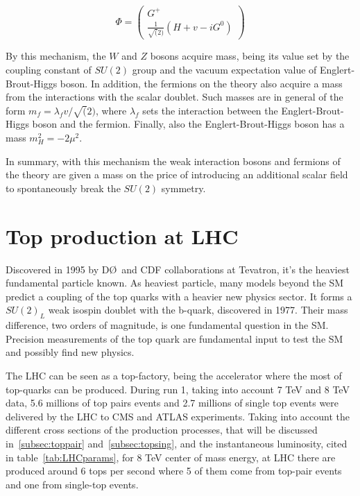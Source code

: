 \begin{equation}
  \label{eq:TransHiggsDoublet}
  \Phi=\left(
    \begin{array}{c}
      G^{+} \\
      \frac{1}{\sqrt(2)}(H+v-iG^{0})
    \end{array}
  \right)
\end{equation}

By this mechanism, the $W$ and $Z$ bosons acquire mass, being its value set by the coupling constant of $SU(2)$ group and the vacuum expectation value of Englert-Brout-Higgs boson. In addition, the fermions on the theory also acquire a mass from the interactions with the scalar doublet. Such masses are in general of the form $m_{f}=\lambda_{f}v/\sqrt(2)$, where $\lambda_{f}$ sets the interaction between the Englert-Brout-Higgs boson and the fermion. Finally, also the Englert-Brout-Higgs boson has a mass $m_{H}^{2}=-2\mu^{2}$.

In summary, with this mechanism the weak interaction bosons and fermions of the theory are given a mass on the price of introducing an additional scalar field to spontaneously break the $SU(2)$ symmetry.

\section{Top production at LHC}

Discovered in 1995 by D\O~and CDF collaborations at Tevatron, it's the heaviest fundamental particle known. As heaviest particle, many models beyond the SM predict a coupling of the top quarks with a heavier new physics sector. It forms a $SU(2)_{L}$ weak isospin doublet with the b-quark, discovered in 1977. Their mass difference, two orders of magnitude, is one fundamental question in the SM. Precision measurements of the top quark are fundamental input to test the SM and possibly find new physics.

The LHC can be seen as a top-factory, being the accelerator where the most of top-quarks can be produced. During run 1, taking into account 7 TeV and 8 TeV data, 5.6 millions of top pairs events and 2.7 millions of single top events were delivered by the LHC to CMS and ATLAS experiments. Taking into account the different cross sections of the production processes, that will be discussed in~\ref{subsec:toppair} and~\ref{subsec:topsing}, and the instantaneous luminosity, cited in table~\ref{tab:LHCparams}, for 8 TeV center of mass energy, at LHC there are produced around 6 tops per second where 5 of them come from top-pair events and one from single-top events.  

